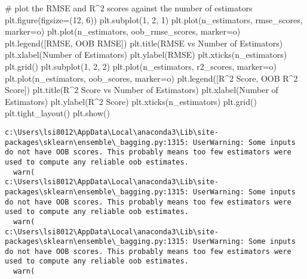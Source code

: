 \documentclass[
  letterpaper,
  DIV=11,
  numbers=noendperiod]{scrreprt}
\newenvironment{Shaded}{\begin{snugshade}}{\end{snugshade}}
\newcommand{\CommentTok}[1]{\textcolor[rgb]{0.37,0.37,0.37}{#1}}
\newcommand{\DecValTok}[1]{\textcolor[rgb]{0.68,0.00,0.00}{#1}}
\newcommand{\NormalTok}[1]{\textcolor[rgb]{0.00,0.23,0.31}{#1}}
\newcommand{\OperatorTok}[1]{\textcolor[rgb]{0.37,0.37,0.37}{#1}}
\newcommand{\StringTok}[1]{\textcolor[rgb]{0.13,0.47,0.30}{#1}}
\begin{document}
\begin{Shaded}
\begin{Highlighting}[]
\CommentTok{\# plot the RMSE and R\^{}2 scores against the number of estimators}
\NormalTok{plt.figure(figsize}\OperatorTok{=}\NormalTok{(}\DecValTok{12}\NormalTok{, }\DecValTok{6}\NormalTok{))}
\NormalTok{plt.subplot(}\DecValTok{1}\NormalTok{, }\DecValTok{2}\NormalTok{, }\DecValTok{1}\NormalTok{)}
\NormalTok{plt.plot(n\_estimators, rmse\_scores, marker}\OperatorTok{=}\StringTok{\textquotesingle{}o\textquotesingle{}}\NormalTok{)}
\NormalTok{plt.plot(n\_estimators, oob\_rmse\_scores, marker}\OperatorTok{=}\StringTok{\textquotesingle{}o\textquotesingle{}}\NormalTok{)}
\NormalTok{plt.legend([}\StringTok{\textquotesingle{}RMSE\textquotesingle{}}\NormalTok{, }\StringTok{\textquotesingle{}OOB RMSE\textquotesingle{}}\NormalTok{])}
\NormalTok{plt.title(}\StringTok{\textquotesingle{}RMSE vs Number of Estimators\textquotesingle{}}\NormalTok{)}
\NormalTok{plt.xlabel(}\StringTok{\textquotesingle{}Number of Estimators\textquotesingle{}}\NormalTok{)}
\NormalTok{plt.ylabel(}\StringTok{\textquotesingle{}RMSE\textquotesingle{}}\NormalTok{)}
\NormalTok{plt.xticks(n\_estimators)}
\NormalTok{plt.grid()}
\NormalTok{plt.subplot(}\DecValTok{1}\NormalTok{, }\DecValTok{2}\NormalTok{, }\DecValTok{2}\NormalTok{)}
\NormalTok{plt.plot(n\_estimators, r2\_scores, marker}\OperatorTok{=}\StringTok{\textquotesingle{}o\textquotesingle{}}\NormalTok{)}
\NormalTok{plt.plot(n\_estimators, oob\_scores, marker}\OperatorTok{=}\StringTok{\textquotesingle{}o\textquotesingle{}}\NormalTok{)}
\NormalTok{plt.legend([}\StringTok{\textquotesingle{}R\^{}2 Score\textquotesingle{}}\NormalTok{, }\StringTok{\textquotesingle{}OOB R\^{}2 Score\textquotesingle{}}\NormalTok{])}
\NormalTok{plt.title(}\StringTok{\textquotesingle{}R\^{}2 Score vs Number of Estimators\textquotesingle{}}\NormalTok{)}
\NormalTok{plt.xlabel(}\StringTok{\textquotesingle{}Number of Estimators\textquotesingle{}}\NormalTok{)}
\NormalTok{plt.ylabel(}\StringTok{\textquotesingle{}R\^{}2 Score\textquotesingle{}}\NormalTok{)}
\NormalTok{plt.xticks(n\_estimators)}
\NormalTok{plt.grid()}
\NormalTok{plt.tight\_layout()}
\NormalTok{plt.show()}
\end{Highlighting}
\end{Shaded}

\begin{verbatim}
c:\Users\lsi8012\AppData\Local\anaconda3\Lib\site-packages\sklearn\ensemble\_bagging.py:1315: UserWarning: Some inputs do not have OOB scores. This probably means too few estimators were used to compute any reliable oob estimates.
  warn(
c:\Users\lsi8012\AppData\Local\anaconda3\Lib\site-packages\sklearn\ensemble\_bagging.py:1315: UserWarning: Some inputs do not have OOB scores. This probably means too few estimators were used to compute any reliable oob estimates.
  warn(
c:\Users\lsi8012\AppData\Local\anaconda3\Lib\site-packages\sklearn\ensemble\_bagging.py:1315: UserWarning: Some inputs do not have OOB scores. This probably means too few estimators were used to compute any reliable oob estimates.
  warn(
\end{verbatim}
\end{document}
